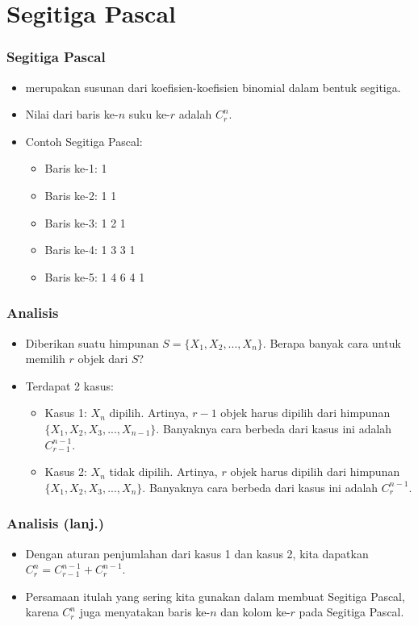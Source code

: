 \section{Segitiga Pascal}
\frame{\sectionpage}

\begin{frame}
\frametitle{Segitiga Pascal}
\begin{itemize}
  \item {} merupakan susunan dari koefisien-koefisien binomial dalam bentuk segitiga.
  \item Nilai dari baris ke-$n$ suku ke-$r$ adalah $C^{n}_{r}$.
  \item Contoh Segitiga Pascal:
  \begin{itemize} 
    \item Baris ke-1: 1
    \item Baris ke-2: 1 1
    \item Baris ke-3: 1 2 1
    \item Baris ke-4: 1 3 3 1
    \item Baris ke-5: 1 4 6 4 1
  \end{itemize}
\end{itemize}
\end{frame}

\begin{frame}
\frametitle{Analisis}
\begin{itemize}
  \item Diberikan suatu himpunan $S = \{X_{1},X_{2},...,X_{n}\}$. Berapa banyak cara untuk memilih $r$ objek dari $S$?
  \item Terdapat 2 kasus:
  \begin{itemize}
    \item Kasus 1: $X_{n}$ dipilih.
    Artinya, $r-1$ objek harus dipilih dari himpunan $\{X_{1},X_{2},X_{3},...,X_{n-1}\}$. Banyaknya cara berbeda dari kasus ini adalah $C^{n-1}_{r-1}$.
    \item Kasus 2: $X_{n}$ tidak dipilih. Artinya, $r$ objek harus dipilih dari himpunan $\{X_{1},X_{2},X_{3},...,X_{n}\}$. Banyaknya cara berbeda dari kasus ini adalah $C^{n-1}_{r}$.
  \end{itemize}
\end{itemize}
\end{frame}

\begin{frame}
\frametitle{Analisis (lanj.)}
\begin{itemize}
  \item Dengan aturan penjumlahan dari kasus 1 dan kasus 2, kita dapatkan $C^{n}_{r} = C^{n-1}_{r-1} + C^{n-1}_{r}$.
  \item Persamaan itulah yang sering kita gunakan dalam membuat Segitiga Pascal, karena $C^n_r$ juga menyatakan baris ke-$n$ dan kolom ke-$r$ pada Segitiga Pascal.
\end{itemize}
\end{frame}

